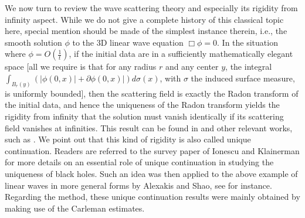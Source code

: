 \documentclass[10pt,reqno]{amsart}
\numberwithin{equation}{section}
\begin{document}
We now turn to  
review the wave scattering theory and especially its rigidity from infinity aspect. 
While we do not give a complete history of this classical topic here, 
special mention should be made of the simplest instance therein, i.e., the smooth solution $\phi
$ to the 3D linear wave equation $\Box\phi=0$. 
In the situation  where $\phi=O(\frac{1}{t})$, if the initial data are in a sufficiently 
 mathematically elegant  space 
 	[all we require is that for any 
 radius	 $r$ and any center $y$, the integral $\int_{B_r(y)} (|\phi(0,x)|+\partial\phi(0,x)|)d\sigma(x)$,  	with $\sigma$ the induced surface measure, is uniformly bounded], then the scattering field is exactly the Radon transform of the initial data, and hence the uniqueness of the Radon transform yields the rigidity from infinity that the solution must vanish identically if its scattering field vanishes at infinities. This result can be found in \cite{Lax-P} and other relevant works, 
such as  \cite{Friedlander80,Ludwig}. We point out that this kind of rigidity is also called unique continuation. Readers are referred to the survey paper of Ionescu and Klainerman  \cite{Ionescu_Klainerman_Survey} for more details on an  essential role of unique continuation in  studying the uniqueness of black holes. Such an idea was then applied to the above example of linear waves in more general forms by Alexakis and Shao, see \cite{A-S} for instance. 
 Regarding the method, these unique continuation results were mainly obtained by making use of the Carleman  estimates. 
 
 

 
\end{document}
